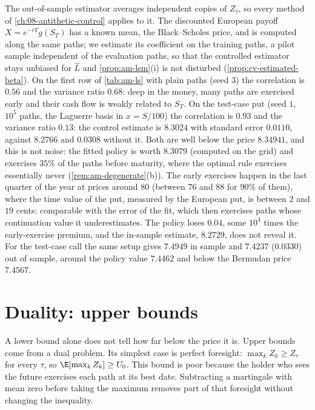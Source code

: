 \begin{example}\label{exa:am-test-case}
The out-of-sample estimator averages independent copies of $Z_{\hat\tau}$, so every method
of \cref{ch:08-antithetic-control} applies to it. The discounted European payoff
$X=e^{-rT}g(S_T)$ has a known mean, the Black--Scholes price, and is computed along the
same paths; we estimate its coefficient on the training paths, a pilot sample independent of
the evaluation paths, so that the controlled estimator stays unbiased for $\hat L$ and
\cref{prop:am-lsm}(i) is not disturbed (\cref{prop:cv-estimated-beta}). On the first row of
\cref{tab:am-ls} with plain paths (seed $3$) the correlation is $0.56$ and the variance
ratio $0.68$: deep in the money, many paths are exercised early and their cash flow is
weakly related to $S_T$. On the test-case put (seed $1$, $10^5$ paths, the Laguerre basis
in $x=S/100$) the correlation is $0.93$ and the variance ratio $0.13$: the control
estimate is $8.3024$ with standard error $0.0110$, against $8.2766$ and $0.0308$ without it.
Both are well below the price $8.34941$, and this is not noise: the fitted policy is worth
$8.3079$ (computed on the grid) and exercises $35\%$ of the paths before maturity, where
the optimal rule exercises essentially never (\cref{rem:am-degenerate}(b)). The early
exercises happen in the last quarter of the year at prices around $80$ (between $76$ and
$88$ for $90\%$ of them), where the time value of the put, measured by the European put, is
between $2$ and $19$ cents: comparable with the error of the fit, which then exercises paths
whose continuation value it underestimates. The policy loses $0.04$, some $10^4$ times the
early-exercise premium, and the in-sample estimate, $8.2729$, does not reveal it. For the test-case call the same setup gives $7.4949$
in sample and $7.4237$ ($0.0330$) out of sample, around the policy value $7.4462$ and below
the Bermudan price $7.4567$.
\end{example}


\section{Duality: upper bounds}\label{sec:am-duality}

A lower bound alone does not tell how far below the price it is. Upper bounds come from a
dual problem. Its simplest case is perfect foresight: $\max_kZ_k\ge Z_\tau$ for every
$\tau$, so $\E[\max_kZ_k]\ge U_0$. This bound is poor because the holder who sees the future
exercises each path at its best date. Subtracting a martingale with mean zero before taking
the maximum removes part of that foresight without changing the inequality.

